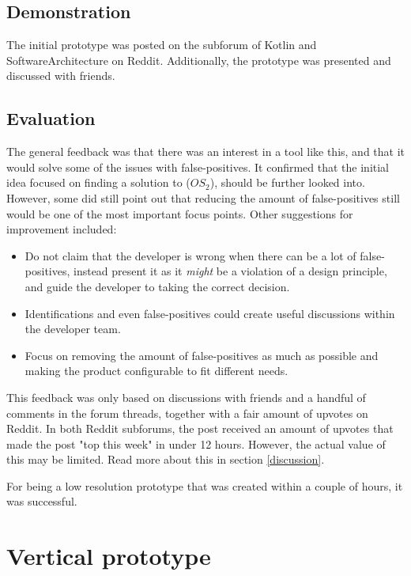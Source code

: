 \documentclass{report}
\begin{document}
\subsection*{Demonstration}
The initial prototype was posted on the subforum of Kotlin\cite{kotlin-reddit} and SoftwareArchitecture\cite{softwarearch-reddit} on Reddit. Additionally, the prototype was presented and discussed with friends. 

\subsection*{Evaluation}

The general feedback was that there was an interest in a tool like this, and that it would solve some of the issues with false-positives. It confirmed that the initial idea focused on finding a solution to (\(OS_{2}\)), should be further looked into. However, some did still point out that reducing the amount of false-positives still would be one of the most important focus points. Other suggestions for improvement included: 
\begin{itemize}
    \item Do not claim that the developer is wrong when there can be a lot of false-positives, instead present it as it \textit{might} be a violation of a design principle, and guide the developer to taking the correct decision.
    \item Identifications and even false-positives could create useful discussions within the developer team.
    \item Focus on removing the amount of false-positives as much as possible and making the product configurable to fit different needs.
  
\end{itemize}

This feedback was only based on discussions with friends and a handful of comments in the forum threads, together with a fair amount of upvotes on Reddit. In both Reddit subforums, the post received an amount of upvotes that made the post "top this week" in under 12 hours. However, the actual value of this may be limited. Read more about this in section \ref{discussion}. 

For being a low resolution prototype that was created within a couple of hours, it was successful.

\section{Vertical prototype}
\label{vertical-prototype}
\end{document}
